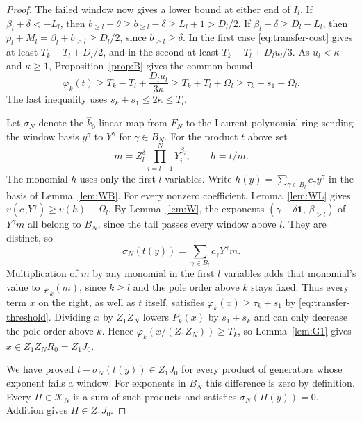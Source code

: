 \documentclass[11pt, letterpaper]{article}
\theoremstyle{definition}
\theoremstyle{remark}
\begin{document}
\begin{proof}
    The failed window now gives a lower bound at either end of $I_{l}$.
    If $\beta_{l} + \delta < -L_{l}$, then $b_{\ge l} - \theta \ge b_{\ge l} - \delta \ge L_{l} + 1 > D_{l}/2$.
    If $\beta_{l} + \delta \ge D_{l} - L_{l}$, then $p_{l} + M_{l} = \beta_{l} + b_{\ge l} \ge D_{l}/2$, since $b_{\ge l} \ge \delta$.
    In the first case \eqref{eq:transfer-cost} gives at least $T_{k} - T_{l} + D_{l}/2$, and in the second at least $T_{k} - T_{l} + D_{l}u_{l}/3$.
    As $u_{l} < \kappa$ and $\kappa \ge 1$, Proposition~\ref{prop:B} gives the common bound
    \begin{equation}
        \label{eq:transfer-threshold}
        \varphi_{k}(t) \ge T_{k} - T_{l} + \frac{D_{l}u_{l}}{3\kappa}
        \ge T_{k} + T_{l} + \Omega_{l}
        \ge \tau_{k} + s_{1} + \Omega_{l}.
    \end{equation}
    The last inequality uses $s_{k} + s_{1} \le 2\kappa \le T_{l}$.

    Let $\sigma_{N}$ denote the $\widehat{k}_{0}$-linear map from $F_{N}$ to the Laurent polynomial ring sending the window basis $y^{\gamma}$ to $Y^{\gamma}$ for $\gamma \in B_{N}$.
    For the product $t$ above set
    \[
        m = Z_{l}^{\delta}\prod_{i = l + 1}^{N}Y_{i}^{\beta_{i}},
        \qquad h = t/m.
    \]
    The monomial $h$ uses only the first $l$ variables.
    Write $h(y) = \sum_{\gamma \in B_{l}} c_{\gamma}y^{\gamma}$ in the basis of Lemma~\ref{lem:WB}.
    For every nonzero coefficient, Lemma~\ref{lem:WL} gives $v(c_{\gamma}Y^{\gamma}) \ge v(h) - \Omega_{l}$.
    By Lemma~\ref{lem:W}, the exponents $(\gamma - \delta\mathbf{1},\,\beta_{>l})$ of $Y^{\gamma}m$ all belong to $B_{N}$, since the tail passes every window above $l$.
    They are distinct, so
    \[
        \sigma_{N}(t(y)) = \sum_{\gamma \in B_{l}} c_{\gamma}Y^{\gamma}m.
    \]
    Multiplication of $m$ by any monomial in the first $l$ variables adds that monomial's value to $\varphi_{k}(m)$, since $k \ge l$ and the pole order above $k$ stays fixed.
    Thus every term $x$ on the right, as well as $t$ itself, satisfies $\varphi_{k}(x) \ge \tau_{k} + s_{1}$ by \eqref{eq:transfer-threshold}.
    Dividing $x$ by $Z_{1}Z_{N}$ lowers $P_{k}(x)$ by $s_{1} + s_{k}$ and can only decrease the pole order above $k$.
    Hence $\varphi_{k}(x/(Z_{1}Z_{N})) \ge T_{k}$, so Lemma~\ref{lem:G1} gives $x \in Z_{1}Z_{N}R_{0} = Z_{1}J_{0}$.

    We have proved $t - \sigma_{N}(t(y)) \in Z_{1}J_{0}$ for every product of generators whose exponent fails a window.
    For exponents in $B_{N}$ this difference is zero by definition.
    Every $\Pi \in \mathcal{K}_{N}$ is a sum of such products and satisfies $\sigma_{N}(\Pi(y)) = 0$.
    Addition gives $\Pi \in Z_{1}J_{0}$.
\end{proof}
\end{document}
